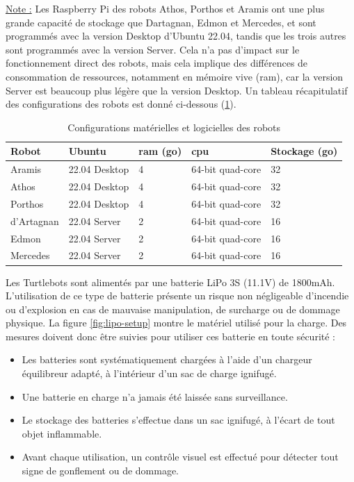\noindent \underline{Note :} Les Raspberry Pi des robots Athos, Porthos et Aramis ont une plus grande capacité de stockage que Dartagnan, Edmon et Mercedes, et sont programmés avec la version Desktop d'Ubuntu 22.04, tandis que les trois autres sont programmés avec la version Server. Cela n'a pas d'impact sur le fonctionnement direct des robots, mais cela implique des différences de consommation de ressources, notamment en mémoire vive (\gls*{ram}), car la version Server est beaucoup plus légère que la version Desktop.
Un tableau récapitulatif des configurations des robots est donné ci-dessous (\ref{tab:config-robots}).
\begin{table}[H]
    \centering
    \small
    \begin{tabular}{|l|l|l|l|l|}
        \hline
        Robot & Ubuntu & \gls*{ram} (\gls*{go}) & \gls*{cpu} & Stockage (\gls*{go}) \\
        \hline
        Aramis &  22.04 Desktop & 4 & 64-bit quad-core & 32 \\
        Athos &  22.04 Desktop & 4 & 64-bit quad-core & 32 \\
        Porthos &  22.04 Desktop & 4 & 64-bit quad-core & 32 \\
        d'Artagnan &  22.04 Server & 2 & 64-bit quad-core & 16 \\
        Edmon &  22.04 Server & 2 & 64-bit quad-core & 16 \\
        Mercedes &  22.04 Server & 2 & 64-bit quad-core & 16 \\
        \hline
    \end{tabular}
    \caption{Configurations matérielles et logicielles des robots}
    \label{tab:config-robots}
\end{table}


Les Turtlebots sont alimentés par une batterie LiPo 3S (11.1V) de 1800mAh. L'utilisation de ce type de batterie présente un risque non négligeable d'incendie ou d'explosion en cas de mauvaise manipulation, de surcharge ou de dommage physique. La figure \ref{fig:lipo-setup} montre le matériel utilisé pour la charge.
Des mesures doivent donc être suivies pour utiliser ces batterie en toute sécurité :
\begin{itemize}
    \item Les batteries sont systématiquement chargées à l'aide d'un chargeur équilibreur adapté, à l'intérieur d'un sac de charge ignifugé.
    \item Une batterie en charge n'a jamais été laissée sans surveillance.
    \item Le stockage des batteries s'effectue dans un sac ignifugé, à l'écart de tout objet inflammable.
    \item Avant chaque utilisation, un contrôle visuel est effectué pour détecter tout signe de gonflement ou de dommage.
\end{itemize}

